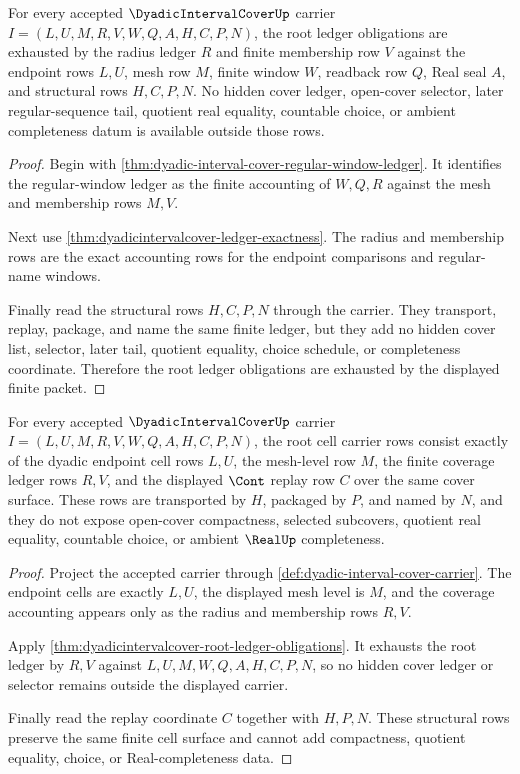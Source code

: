 \begin{theorem}
\label{thm:dyadicintervalcover-root-ledger-obligations}
For every accepted $\DyadicIntervalCoverUp$ carrier $I=(L,U,M,R,V,W,Q,A,H,C,P,N)$, the root ledger obligations are exhausted by the radius ledger $R$ and finite membership row $V$ against the endpoint rows $L,U$, mesh row $M$, finite window $W$, readback row $Q$, Real seal $A$, and structural rows $H,C,P,N$. No hidden cover ledger, open-cover selector, later regular-sequence tail, quotient real equality, countable choice, or ambient completeness datum is available outside those rows.
\end{theorem}
\begin{proof}
Begin with \autoref{thm:dyadic-interval-cover-regular-window-ledger}. It identifies the regular-window ledger as the finite accounting of $W,Q,R$ against the mesh and membership rows $M,V$.

Next use \autoref{thm:dyadicintervalcover-ledger-exactness}. The radius and membership rows are the exact accounting rows for the endpoint comparisons and regular-name windows.

Finally read the structural rows $H,C,P,N$ through the carrier. They transport, replay, package, and name the same finite ledger, but they add no hidden cover list, selector, later tail, quotient equality, choice schedule, or completeness coordinate. Therefore the root ledger obligations are exhausted by the displayed finite packet.
\end{proof}

\begin{theorem}
\label{thm:dyadicintervalcover-root-cell-carrier}
For every accepted $\DyadicIntervalCoverUp$ carrier $I=(L,U,M,R,V,W,Q,A,H,C,P,N)$, the root cell carrier rows consist exactly of the dyadic endpoint cell rows $L,U$, the mesh-level row $M$, the finite coverage ledger rows $R,V$, and the displayed $\Cont$ replay row $C$ over the same cover surface. These rows are transported by $H$, packaged by $P$, and named by $N$, and they do not expose open-cover compactness, selected subcovers, quotient real equality, countable choice, or ambient $\RealUp$ completeness.
\end{theorem}
\begin{proof}
Project the accepted carrier through \autoref{def:dyadic-interval-cover-carrier}. The endpoint cells are exactly $L,U$, the displayed mesh level is $M$, and the coverage accounting appears only as the radius and membership rows $R,V$.

Apply \autoref{thm:dyadicintervalcover-root-ledger-obligations}. It exhausts the root ledger by $R,V$ against $L,U,M,W,Q,A,H,C,P,N$, so no hidden cover ledger or selector remains outside the displayed carrier.

Finally read the replay coordinate $C$ together with $H,P,N$. These structural rows preserve the same finite cell surface and cannot add compactness, quotient equality, choice, or Real-completeness data.
\end{proof}

